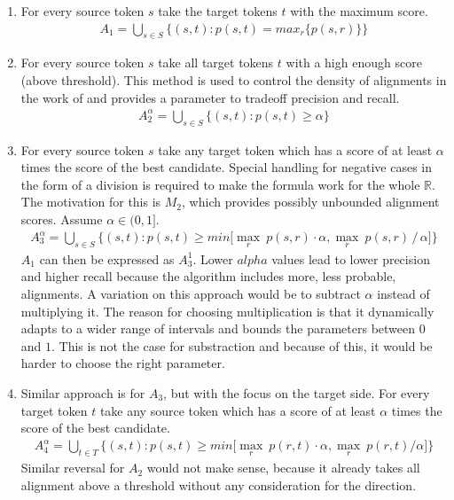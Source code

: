 \begin{enumerate}
    \item For every source token $s$ take the target tokens $t$ with the maximum score.
    \begin{gather*}
        A_1 = \bigcup_{s \in S} \{ (s, t): p(s,t) = max_r \{p(s,r) \} \}
    \end{gather*}
    
    \item For every source token $s$ take all target tokens $t$ with a high enough score (above threshold). This method is used to control the density of alignments in the work of \citet{liang2006alignment} and provides a parameter to tradeoff precision and recall.
    \begin{gather*}
        A_2^\alpha = \bigcup_{s \in S} \{(s, t): p(s,t) \ge \alpha \}
    \end{gather*}
    
    \item For every source token $s$ take any target token which has a score of at least $\alpha$ times the score of the best candidate. Special handling for negative cases in the form of a division is required to make the formula work for the whole $\mathbb{R}$. The motivation for this is $M_2$, which provides possibly unbounded alignment scores. Assume $\alpha \in (0, 1]$.
    \begin{gather*}
        A_3^\alpha = \bigcup_{s \in S} \{ (s, t): p(s,t) \ge min
        \big[ \max_r\ p(s,r) \cdot \alpha, \max_r\ p(s,r)\, /\, \alpha \big] \}
    \end{gather*}
    $A_1$ can then be expressed as $A_3^1$. Lower $alpha$ values lead to lower precision and higher recall because the algorithm includes more, less probable, alignments. A variation on this approach would be to subtract $\alpha$ instead of multiplying it. The reason for choosing multiplication is that it dynamically adapts to a wider range of intervals and bounds the parameters between $0$ and $1$. This is not the case for substraction and because of this, it would be harder to choose the right parameter. 
    
    \smallskip
    \item Similar approach is for $A_3$, but with the focus on the target side. For every target token $t$ take any source token which has a score of at least $\alpha$ times the score of the best candidate.
    \begin{gather*}
        A_4^\alpha = \bigcup_{t \in T} \{ (s, t): p(s,t) \ge min
        \big[ \max_r\ p(r,t) \cdot \alpha, \max_r\ p(r,t) / \alpha \big] \}
    \end{gather*}
    Similar reversal for $A_2$ would not make sense, because it already takes all alignment above a threshold without any consideration for the direction.
    

\end{enumerate}
